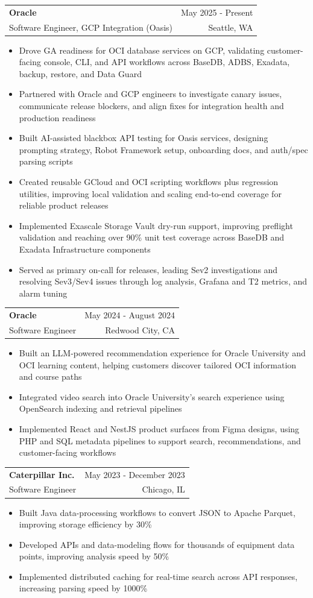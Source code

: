 \documentclass[letterpaper,11pt]{article}
\makeatletter
\newcommand{\resumeItem}[1]{
  \item\small{
    {#1 \vspace{-1pt}}
  }
}
\newcommand{\resumeSubheading}[4]{
  \vspace{-2pt}\item
    \begin{tabular*}{0.97\textwidth}[t]{l@{\extracolsep{\fill}}r}
      \textbf{#1} & #2 \\
      {\small#3} & {\small #4} \\
    \end{tabular*}\vspace{-7pt}
}
\newcommand{\resumeItemListStart}{\begin{itemize}[leftmargin=0.18in,itemsep=1pt,topsep=2pt]}
\newcommand{\resumeItemListEnd}{\end{itemize}\vspace{-5pt}}
\makeatother
\begin{document}
    \resumeSubheading
  {Oracle}{May 2025 - Present}
  {Software Engineer, GCP Integration (Oasis)}{Seattle, WA}
  \resumeItemListStart
    \resumeItem{Drove GA readiness for OCI database services on GCP, validating customer-facing console, CLI, and API workflows across BaseDB, ADBS, Exadata, backup, restore, and Data Guard}
    \resumeItem{Partnered with Oracle and GCP engineers to investigate canary issues, communicate release blockers, and align fixes for integration health and production readiness}
    \resumeItem{Built AI-assisted blackbox API testing for Oasis services, designing prompting strategy, Robot Framework setup, onboarding docs, and auth/spec parsing scripts}
    \resumeItem{Created reusable GCloud and OCI scripting workflows plus regression utilities, improving local validation and scaling end-to-end coverage for reliable product releases}
    \resumeItem{Implemented Exascale Storage Vault dry-run support, improving preflight validation and reaching over 90\% unit test coverage across BaseDB and Exadata Infrastructure components}
    \resumeItem{Served as primary on-call for releases, leading Sev2 investigations and resolving Sev3/Sev4 issues through log analysis, Grafana and T2 metrics, and alarm tuning}
  \resumeItemListEnd

    \resumeSubheading
      {Oracle}{May 2024 - August 2024}
      {Software Engineer}{Redwood City, CA}
      \resumeItemListStart
        \resumeItem{Built an LLM-powered recommendation experience for Oracle University and OCI learning content, helping customers discover tailored OCI information and course paths}
        \resumeItem{Integrated video search into Oracle University's search experience using OpenSearch indexing and retrieval pipelines}
        \resumeItem{Implemented React and NestJS product surfaces from Figma designs, using PHP and SQL metadata pipelines to support search, recommendations, and customer-facing workflows}
      \resumeItemListEnd

    \resumeSubheading
      {Caterpillar Inc.}{May 2023 - December 2023}
      {Software Engineer}{Chicago, IL}
      \resumeItemListStart
        \resumeItem{Built Java data-processing workflows to convert JSON to Apache Parquet, improving storage efficiency by 30\%}
        \resumeItem{Developed APIs and data-modeling flows for thousands of equipment data points, improving analysis speed by 50\%}
        \resumeItem{Implemented distributed caching for real-time search across API responses, increasing parsing speed by 1000\%}
      \resumeItemListEnd
\end{document}
